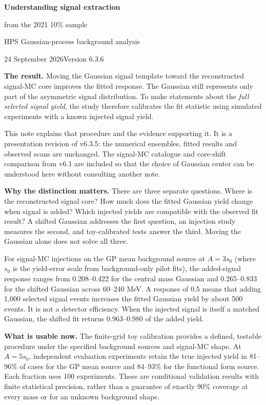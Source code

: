 \documentclass[11pt]{article}
\begin{document}
{\LARGE\bfseries Understanding signal extraction\par from the 2021 10\% sample}\par
{\large HPS Gaussian-process background analysis}\par
24 September 2026\hfill Version 6.3.6

\textbf{The result.} Moving the Gaussian signal template toward the reconstructed signal-MC core improves the fitted response. The Gaussian still represents only part of the asymmetric signal distribution. To make statements about the \emph{full selected signal yield}, the study therefore calibrates the fit statistic using simulated experiments with a known injected signal yield.

This note explains that procedure and the evidence supporting it. It is a presentation revision of v6.3.5: the numerical ensembles, fitted results and observed scans are unchanged. The signal-MC catalogue and core-shift comparison from v6.1 are included so that the choice of Gaussian center can be understood here without consulting another note.

\textbf{Why the distinction matters.} There are three separate questions. Where is the reconstructed signal core? How much does the fitted Gaussian yield change when signal is added? Which injected yields are compatible with the observed fit result? A shifted Gaussian addresses the first question, an injection study measures the second, and toy-calibrated tests answer the third. Moving the Gaussian alone does not solve all three.

For signal-MC injections on the GP mean background source at $A=3s_0$ (where $s_0$ is the yield-error scale from background-only pilot fits), the added-signal response ranges from 0.208--0.422 for the central mass Gaussian and 0.265--0.833 for the shifted Gaussian across 60--240 MeV. A response of 0.5 means that adding 1,000 selected signal events increases the fitted Gaussian yield by about 500 events. It is not a detector efficiency. When the injected signal is itself a matched Gaussian, the shifted fit returns 0.963--0.980 of the added yield.

\textbf{What is usable now.} The finite-grid toy calibration provides a defined, testable procedure under the specified background sources and signal-MC shape. At $A=5s_0$, independent evaluation experiments retain the true injected yield in 81--96\% of cases for the GP mean source and 84--93\% for the functional form source. Each fraction uses 100 experiments. These are conditional validation results with finite statistical precision, rather than a guarantee of exactly 90\% coverage at every mass or for an unknown background shape.
\end{document}
